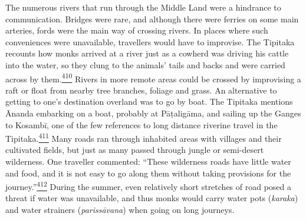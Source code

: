 The numerous rivers that run through the Middle Land were a hindrance to
communication. Bridges were rare, and although there were ferries on
some main arteries, fords were the main way of crossing rivers. In
places where such conveniences were unavailable, travellers would have
to improvise. The Tipitaka recounts how monks arrived at a river just as
a cowherd was driving his cattle into the water, so they clung to the
animals' tails and backs and were carried across by
them.\label{footprints_split_012.html_fnref410}\hyperref[footprints_split_025.htmlux5cux23fn410]{\textsuperscript{410}}
Rivers in more remote areas could be crossed by improvising a raft or
float from nearby tree branches, foliage and grass. An alternative to
getting to one's destination overland was to go by boat. The Tipitaka
mentions Ānanda embarking on a boat, probably at Pāṭaligāma, and sailing
up the Ganges to Kosambī, one of the few references to long distance
riverine travel in the
Tipitaka.\label{footprints_split_012.html_fnref411}\hyperref[footprints_split_025.htmlux5cux23fn411]{\textsuperscript{411}}
Many roads ran through inhabited areas with villages and their
cultivated fields, but just as many passed through jungle or semi-desert
wilderness. One traveller commented: ``These wilderness roads have
little water and food, and it is not easy to go along them without
taking provisions for the
journey.''\label{footprints_split_012.html_fnref412}\hyperref[footprints_split_025.htmlux5cux23fn412]{\textsuperscript{412}}
During the summer, even relatively short stretches of road posed a
threat if water was unavailable, and thus monks would carry water pots
(\emph{karaka}) and water strainers (\emph{parissāvana}) when going on
long journeys.

